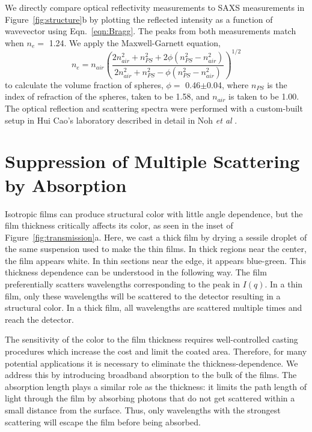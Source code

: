 We directly compare optical reflectivity measurements to SAXS measurements in Figure~\ref{fig:structure}b by plotting the reflected intensity as a function of wavevector using Eqn.~\ref{eqn:Bragg}.
The peaks from both measurements match when $n_{e} =$ 1.24.  We apply the Maxwell-Garnett equation,
\begin{equation}\label{eqn:maxwell-garnett}
n_{e} = n_{air}\left(\frac{2n_{air}^2 + n_{PS}^2 + 2\phi(n_{PS}^2 - n_{air}^2)}{2n_{air}^2 + n_{PS}^2 - \phi(n_{PS}^2 - n_{air}^2)}\right)^{1/2}
\end{equation} 
to calculate the volume fraction of spheres, $\phi =$ 0.46$\pm$0.04, where $n_{PS}$ is the index of refraction of the spheres, taken to be 1.58, and $n_{air}$ is taken to be 1.00.  
The optical reflection and scattering spectra were performed with a custom-built setup in Hui Cao's laboratory described in detail in Noh \emph{et al} \cite{Noh:2009AM}.


\section{Suppression of Multiple Scattering by Absorption}

Isotropic films can produce structural color with little angle dependence, but the film thickness  critically affects its color, as seen in the inset of Figure~\ref{fig:transmission}a.
Here, we cast a thick film by  drying  a sessile droplet of the same suspension used to make the thin films.
In thick regions near the center, the film appears white.
In thin sections near the edge, it appears blue-green.
This thickness dependence can be understood in the following way.
The film preferentially scatters wavelengths corresponding to the peak in $I(q)$.
In a thin film, only these wavelengths will be scattered to the detector resulting in a structural color.
In a thick film, all wavelengths are scattered multiple times and reach the detector.

The sensitivity of the color to the film thickness requires well-controlled casting procedures which increase the cost and limit the coated area.
Therefore, for many potential applications it is necessary to eliminate the thickness-dependence.
We address this by introducing broadband absorption to the bulk of the films.
The absorption length plays a similar role as the thickness: it limits the path length of light through the film by absorbing photons that do not get scattered within a small distance from the surface. 
Thus, only wavelengths with the strongest scattering will escape the film before being absorbed.

